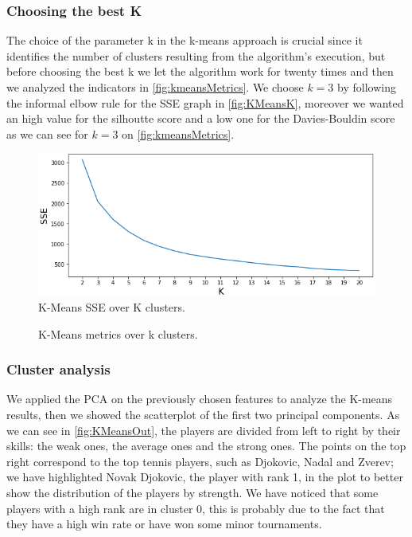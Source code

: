 \subsubsection{Choosing the best K}
The choice of the parameter k in the k-means approach is crucial since it identifies the number of clusters resulting from the algorithm's execution, but before choosing the best k we let the algorithm work for twenty times and then we analyzed the indicators in \autoref{fig:kmeansMetrics}. We choose $k=3$ by following the informal elbow rule for the SSE graph in \autoref{fig:KMeansK}, moreover we wanted an high value for the silhoutte score and a low one for the Davies-Bouldin score as we can see for $k=3$ on \autoref{fig:kmeansMetrics}.
\begin{figure}[H]
    \centering
    \includegraphics[width=0.45\linewidth]{images/clustering/KMeans/KMeans_K.png}
    \caption{K-Means SSE over K clusters.}
    \label{fig:KMeansK}
\end{figure}
\begin{figure}[H]
    \centering
    \caption{K-Means metrics over k clusters.}
    \label{fig:kmeansMetrics}
\end{figure}

\subsubsection{Cluster analysis}
We applied the PCA on the previously chosen features to analyze the K-means results, then we showed the scatterplot of the first two principal components. As we can see in \autoref{fig:KMeansOut}, the players are divided from left to right by their skills: the weak ones, the average ones and the strong ones. The points on the top right correspond to the top tennis players, such as Djokovic, Nadal and Zverev; we have highlighted Novak Djokovic, the player with rank 1, in the plot to better show the distribution of the players by strength. We have noticed that some players with a high rank are in cluster 0, this is probably due to the fact that they have a high win rate or have won some minor tournaments.

